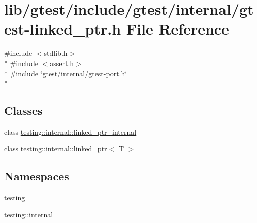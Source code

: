 \hypertarget{gtest-linked__ptr_8h}{\section{lib/gtest/include/gtest/internal/gtest-\/linked\-\_\-ptr.h File Reference}
\label{gtest-linked__ptr_8h}
}
{\ttfamily \#include $<$stdlib.\-h$>$}\\*
{\ttfamily \#include $<$assert.\-h$>$}\\*
{\ttfamily \#include \char`\"{}gtest/internal/gtest-\/port.\-h\char`\"{}}\\*
\subsection*{Classes}
\begin{DoxyCompactItemize}
\item 
class \hyperlink{classtesting_1_1internal_1_1linked__ptr__internal}{testing\-::internal\-::linked\-\_\-ptr\-\_\-internal}
\item 
class \hyperlink{classtesting_1_1internal_1_1linked__ptr}{testing\-::internal\-::linked\-\_\-ptr$<$ T $>$}
\end{DoxyCompactItemize}
\subsection*{Namespaces}
\begin{DoxyCompactItemize}
\item 
\hyperlink{namespacetesting}{testing}
\item 
\hyperlink{namespacetesting_1_1internal}{testing\-::internal}
\end{DoxyCompactItemize}
